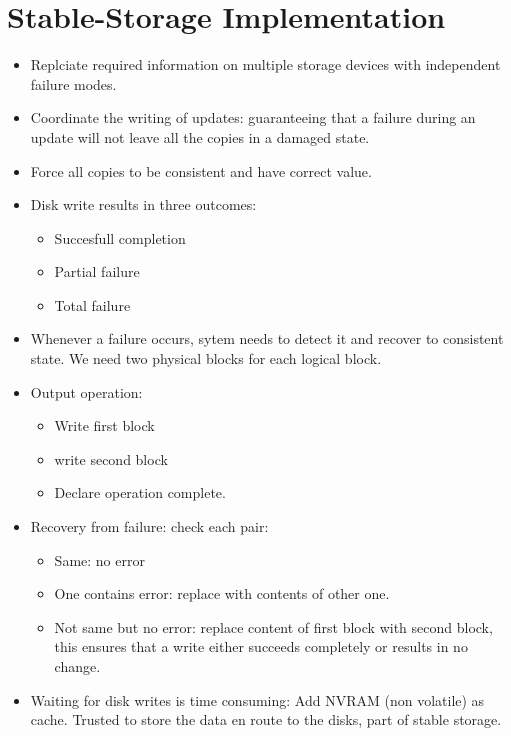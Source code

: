 \documentclass[10pt]{report}
\begin{document}
	\section{Stable-Storage Implementation}
		\begin{itemize}
			\item Replciate required information on multiple storage devices with independent failure modes.
			\item Coordinate the writing of updates: guaranteeing that a failure during an update will not leave all the copies in a damaged state.
			\item Force all copies to be consistent and have correct value.
			\item Disk write results in three outcomes:
			\begin{itemize}
				\item Succesfull completion
				\item Partial failure
				\item Total failure
			\end{itemize}
			\item Whenever a failure occurs, sytem needs to detect it and recover to consistent state. We need two physical blocks for each logical block.
			\item Output operation:
			\begin{itemize}
				\item Write first block
				\item write second block
				\item Declare operation complete.
			\end{itemize}
			\item Recovery from failure: check each pair:
			\begin{itemize}
				\item Same: no error
				\item One contains error: replace with contents of other one.
				\item Not same but no error: replace content of first block with second block, this ensures that a write either succeeds completely or results in no change.
			\end{itemize}
			\item Waiting for disk writes is time consuming: Add NVRAM (non volatile) as cache. Trusted to store the data en route to the disks, part of stable storage.
		\end{itemize}



\end{document}
